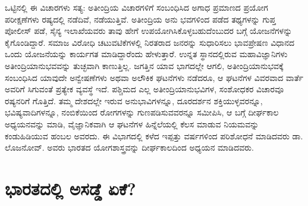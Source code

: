 ಒಟ್ಟಿನಲ್ಲಿ ಈ ವಿಚಾರಗಳು ಸತ್ಯ: ಅತೀಂದ್ರಿಯ ವಿಚಾರಗಳಿಗೆ ಸಂಬಂಧಿಸಿದ ಅಗಾಧ ಪ್ರಮಾಣದ ಪ್ರಯೋಗ ಪರೀಕ್ಷಣೆಗಳು ರಷ್ಯದಲ್ಲಿ ನಡೆದಿವೆ, ನಡೆಯುತ್ತಿವೆ. ಅತೀಂದ್ರಿಯ ಅನು ಭವಗಳಿಂದ ಪಡೆದ ತಥ್ಯಗಳನ್ನು ಗುಪ್ತ ಪೋಲೀಸ್ ಪಡೆ, ಸೈನ್ಯ ಇಲಾಖೆಯವರು ತಾವು ಹೇಗೆ ಉಪಯೋಗಿಸಿಕೊಳ್ಳಬಹುದೆಂಬುದರ ಬಗ್ಗೆ ಯೋಜನೆಗಳನ್ನು ಕೈಗೊಂಡಿದ್ದಾರೆ. ಸಮಾಜ ವಿರೋಧಿ ಚಟುವಟಿಕೆಗಳಲ್ಲಿ ನಿರತರಾದ ಜನರನ್ನು ಸುಧಾರಿಸಲು ಭಾವಪ್ರೇಷಣ ವಿಧಾನದ ಒಂದು ಯೋಜನೆಯನ್ನು ಕಾರ್ಯಗತ ಮಾಡಿದ್ದಾರೆಂದು ಹೇಳುತ್ತಾರೆ. ಉನ್ನತ ಸ್ಥಾನದಲ್ಲಿರುವ ಮಹಾವಿಜ್ಞಾನಿಗಳು ಅತೀಂದ್ರಿಯಾನುಭವವನ್ನು ತುಚ್ಛವಾಗಿ ಕಾಣುತ್ತಿಲ್ಲ. ಜಗತ್ತಿನ ಯಾವ ಭಾಗದಲ್ಲೇ ಆಗಲಿ, ಅತೀಂದ್ರಿಯಾನುಭವಕ್ಕೆ ಸಂಬಂಧಿಸಿದ ಯಾವುದೇ ಅನ್ವೇಷಣೆಗಳು ಅಥವಾ ಅಲೌಕಿಕ ಘಟನೆಗಳು ನಡೆದರೂ, ಆ ಘಟನೆಗಳ ವಿವರವಾದ ವಾರ್ತೆ ಅವರಿಗೆ ಸಿಗುವಂತೆ ಪ್ರತ್ಯೇಕ ವ್ಯವಸ್ಥೆ ಇದೆ. ಪಶ್ಚಿಮದ ಎಲ್ಲ ಅತೀಂದ್ರಿಯಾನುಭವಿಗಳ, ಸಂಶೋಧಕರ ವಿಚಾರವೂ ರಷ್ಯನರಿಗೆ ಗೊತ್ತಿದೆ. ತಮ್ಮ ದೇಶದಲ್ಲೇ ಇರುವ ಅನುಭಾವಿಗಳನ್ನೂ, ದೂರದರ್ಶನ ಶಕ್ತಿಯುಳ್ಳವರನ್ನೂ, ಭವಿಷ್ಯವಾದಿಗಳನ್ನೂ, ನಂಬಿಕೆಯಿಂದ ರೋಗಗಳನ್ನು ಗುಣಪಡಿಸುವವರನ್ನೂ ಸಮೀಪಿಸಿ, ಆ ಬಗ್ಗೆ ದೀರ್ಘಕಾಲ ಅಧ್ಯಯನವನ್ನು ಮಾಡಿ, ವೈಜ್ಞಾನಿಕವಾಗಿ ಆ ಘಟನೆಗಳ ಹಿನ್ನೆಲೆಯಲ್ಲಿ ಕೆಲಸ ಮಾಡುವ ನಿಯಮವನ್ನು ಕಂಡುಹಿಡಿಯುವ ಹಂಬಲ ಅವರದು. ಈ ವಿಭಾಗದಲ್ಲಿ ಕಳೆದ ಇಪ್ಪತ್ತು ವರ್ಷಗಳಿಂದ ಪರಿಶೋಧನೆ ಮಾಡಿದವರು ಡಾ. ಲೊಜನೋವ್. ಅವರು ಭಾರತದ ಯೋಗಶಾಸ್ತ್ರವನ್ನು ದೀರ್ಘಕಾಲದಿಂದ ಅಧ್ಯಯನ ಮಾಡಿದವರು.


\section*{ಭಾರತದಲ್ಲಿ ಅಸಡ್ಡೆ ಏಕೆ?}


